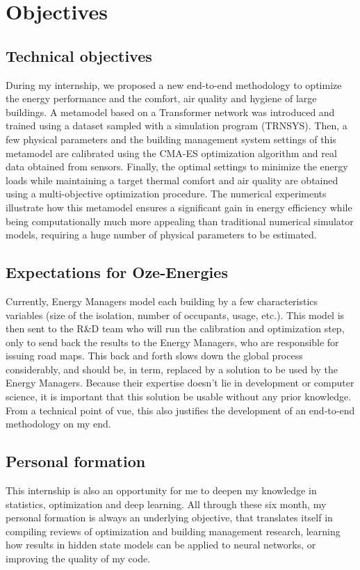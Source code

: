 \documentclass[12pt]{article}
\begin{document}
\section{Objectives}
\label{sec:objectives}

\subsection{Technical objectives}
During my internship, we proposed a new end-to-end methodology to optimize the energy performance and the comfort, air quality and hygiene of large buildings. A metamodel based on a Transformer network was introduced and trained using a dataset sampled with a simulation program (TRNSYS). Then, a few physical parameters and the building management system settings of this metamodel are calibrated using the CMA-ES optimization algorithm and real data obtained from sensors. Finally, the optimal settings to minimize the energy loads while maintaining a target thermal comfort and air quality are obtained using a multi-objective optimization procedure. The numerical experiments illustrate how this metamodel ensures a significant gain in energy efficiency while being computationally much more appealing than traditional numerical simulator models, requiring a huge number of physical parameters to be estimated.

\subsection{Expectations for Oze-Energies}
Currently, Energy Managers model each building by a few characteristics variables (size of the isolation, number of occupants, usage, etc.). This model is then sent to the R\&D team who will run the calibration and optimization step, only to send back the results to the Energy Managers, who are responsible for issuing road maps. This back and forth slows down the global process considerably, and should be, in term, replaced by a solution to be used by the Energy Managers. Because their expertise doesn't lie in development or computer science, it is important that this solution be usable without any prior knowledge. From a technical point of vue, this also justifies the development of an end-to-end methodology on my end.

\subsection{Personal formation}
This internship is also an opportunity for me to deepen my knowledge in statistics, optimization and deep learning. All through these six month, my personal formation is always an underlying objective, that translates itself in compiling reviews of optimization and building management research, learning how results in hidden state models can be applied to neural networks, or improving the quality of my code.
\end{document}
